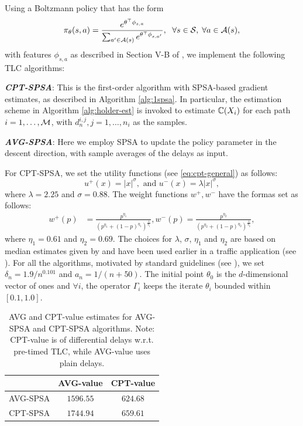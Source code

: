 Using a Boltzmann policy that has the form
$$
\pi_{\theta}(s,a) = \frac{e^{\theta^{\top} \phi_{s,a}}}{\sum_{a' \in {\mathcal{A}(s)}} e^{\theta^{\top} \phi_{s,a'}}},
\hspace{6pt} \forall s \in \mathcal{S},\;\forall a \in \mathcal{A}(s),
$$
with features $\phi_{s,a}$ as described in Section V-B of \cite{prashanth2012threshold},
we implement the following TLC algorithms:

{\bf\em CPT-SPSA}: This is the first-order algorithm with SPSA-based gradient estimates, as described in Algorithm \ref{alg:1spsa}. In particular, the estimation scheme in Algorithm \ref{alg:holder-est} is invoked to estimate $\mathbb{C}(X_i)$ for each path $i=1,\ldots,\mathcal{M}$, with $d_n^{i,j}, j=1,\ldots,n_i$ as the samples.


{\bf\em AVG-SPSA}: Here we employ SPSA to update the policy parameter in the descent direction, with sample averages of the delays as input. 

For CPT-SPSA, we set the utility functions (see \eqref{eq:cpt-general}) as follows:
$$u^+(x) =  |x|^{\sigma}, \text{ and  }u^-(x) = \lambda |x|^{\sigma},$$ 
where $\lambda = 2.25$ and $\sigma = 0.88$.
The weight functions $w^+,w^-$ have the formas set as follows:
\begin{align*}
w^+(p) &= \frac{p^{\eta_1}}{{(p^{\eta_1}+ (1-p)^{\eta_1})}^{\frac{1}{\eta_1}}}, w^-(p) = \frac{p^{\eta_2}}{{(p^{\eta_2}+ (1-p)^{\eta_2})}^{\frac{1}{\eta_2}}},
\end{align*} 
where $\eta_1 = 0.61$ and $\eta_2 = 0.69$. The choices for $\lambda$, $\sigma$, $\eta_1$ and $\eta_2$ are based on median estimates given by \cite{tversky1992advances} and have been used earlier in a traffic application (see \cite{gao2010adaptive}).
For all the algorithms,
 motivated by standard guidelines (see \cite{spall2005introduction}),
 we set $\delta_n = 1.9/n^{0.101}$ and $a_n = 1/(n+50)$. The initial point $\theta_0$ is the $d$-dimensional vector of ones and $\forall i$, the operator $\Gamma_i$ keeps the iterate $\theta_i$ bounded within $[0.1, 1.0]$.

\begin{table}
 \centering
 \begin{tabular}{c|c|c}
  \toprule 
   & \textbf{AVG-value}& \textbf{CPT-value }\\\midrule
   AVG-SPSA & $1596.55$ & $624.68$ \\\midrule
   CPT-SPSA & $1744.94$ & $659.61$\\
   \bottomrule
  \end{tabular}
  \caption{AVG and CPT-value estimates for AVG-SPSA and CPT-SPSA algorithms. Note: CPT-value is of differential delays w.r.t. pre-timed TLC, while 
  AVG-value uses plain delays.}
  \label{tab:cpt-results}
\end{table}

